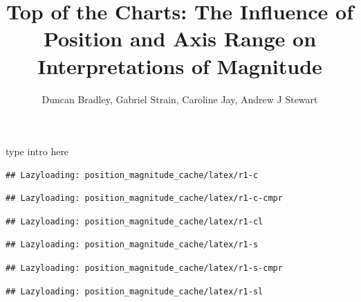 \documentclass[journal]{vgtc}                %
\title{Top of the Charts: The Influence of Position and Axis Range on Interpretations of Magnitude}
\author{Duncan Bradley, Gabriel Strain, Caroline Jay, Andrew J Stewart}
\begin{document}


\maketitle


{type intro here}

\begin{Shaded}
\begin{Highlighting}[]
\NormalTok{(}\NormalTok{)}
\end{Highlighting}
\end{Shaded}

\begin{verbatim}
## Lazyloading: position_magnitude_cache/latex/r1-c
\end{verbatim}

\begin{verbatim}
## Lazyloading: position_magnitude_cache/latex/r1-c-cmpr
\end{verbatim}

\begin{verbatim}
## Lazyloading: position_magnitude_cache/latex/r1-cl
\end{verbatim}

\begin{verbatim}
## Lazyloading: position_magnitude_cache/latex/r1-s
\end{verbatim}

\begin{verbatim}
## Lazyloading: position_magnitude_cache/latex/r1-s-cmpr
\end{verbatim}

\begin{verbatim}
## Lazyloading: position_magnitude_cache/latex/r1-sl
\end{verbatim}
\end{document}
